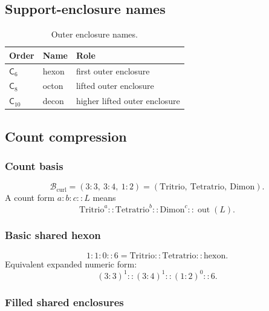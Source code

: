 \subsection{Support-enclosure names}
\label{app:cc-support-enclosure-names}

\begin{table}[H]
\centering
\caption{Outer enclosure names.}
\label{tab:cc-support-enclosure-names}
\renewcommand{\arraystretch}{1.15}
\begin{tabular}{@{}lll@{}}
\toprule
Order & Name & Role \\
\midrule
\(\mathsf C_6\) & hexon & first outer enclosure \\
\(\mathsf C_8\) & octon & lifted outer enclosure \\
\(\mathsf C_{10}\) & decon & higher lifted outer enclosure \\
\bottomrule
\end{tabular}
\end{table}

\subsection{Count compression}
\label{app:cc-count-compression}

\subsubsection{Count basis}
\label{app:cc-count-basis}
\[
\mathcal B_{\mathrm{curl}}
=(3:3,\ 3:4,\ 1:2)
=(\mathrm{Tritrio},\ \mathrm{Tetratrio},\ \mathrm{Dimon}).
\]
A count form \(a:b:c::L\) means
\[
\mathrm{Tritrio}^{a}::\mathrm{Tetratrio}^{b}::\mathrm{Dimon}^{c}::\operatorname{out}(L).
\]

\subsubsection{Basic shared hexon}
\label{app:cc-basic-shared-hexon}
\[
1:1:0::6
=
\mathrm{Tritrio}::\mathrm{Tetratrio}::\mathrm{hexon}.
\]
Equivalent expanded numeric form:
\[
(3:3)^1::(3:4)^1::(1:2)^0::6.
\]


\subsubsection{Filled shared enclosures}
\label{app:cc-filled-shared-enclosures}

